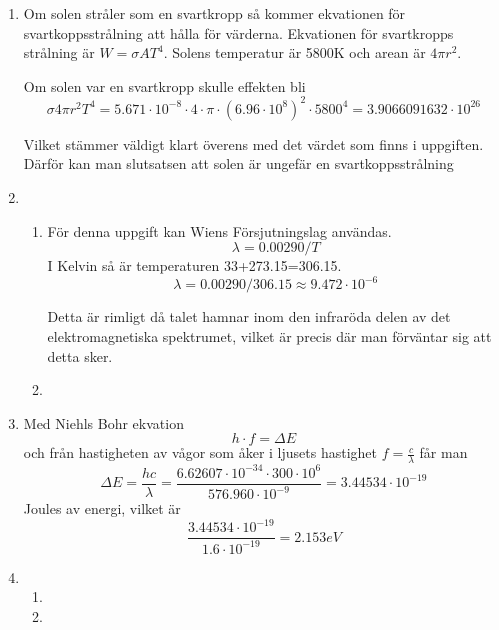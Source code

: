 \documentclass[a4paper,12pt]{article}
\begin{document}
\begin{enumerate}
      \item Om solen stråler som en svartkropp så kommer ekvationen för
            svartkoppsstrålning att hålla för värderna.
            Ekvationen för svartkropps strålning är $W=\sigma A T^4$.
            Solens temperatur är 5800K och arean är $4\pi r^2$.

            Om solen var en svartkropp skulle effekten bli
            $$\sigma 4\pi r^2T^4=5.671\cdot 10^{-8} \cdot 4 \cdot \pi \cdot (6.96\cdot 10^8)^2\cdot 5800^4=3.9066091632\cdot 10^{26}$$

            Vilket stämmer väldigt klart överens med det värdet som finns i uppgiften. Därför
            kan man slutsatsen att solen är ungefär en svartkoppsstrålning

      \item
            \begin{enumerate}
                  \item För denna uppgift kan Wiens Försjutningslag användas.
                        $$\lambda=0.00290/T$$
                        I Kelvin så är temperaturen 33+273.15=306.15.
                        $$\lambda=0.00290/306.15\approx 9.472\cdot 10^{-6}$$

                        Detta är rimligt då talet hamnar inom den infraröda delen
                        av det elektromagnetiska spektrumet, vilket är precis där
                        man förväntar sig att detta sker.

                  \item
            \end{enumerate}


      \item Med Niehls Bohr ekvation
            $$h\cdot f =\Delta E$$
            och från hastigheten av vågor som åker i ljusets hastighet
            $f=\frac{c}{\lambda}$ får man
            $$\Delta E=\frac{hc}{\lambda}=\frac{6.62607\cdot 10^{-34}\cdot 300\cdot 10^6}{576.960\cdot 10^{-9}}=3.44534\cdot 10^{-19}$$
            Joules av energi, vilket är
            $$\frac{3.44534\cdot 10^{-19}}{1.6\cdot 10^{-19}}=2.153 eV$$

      \item 
      \begin{enumerate}
            \item
            
            

            \item


            
      \end{enumerate}
\end{enumerate}
\end{document}
